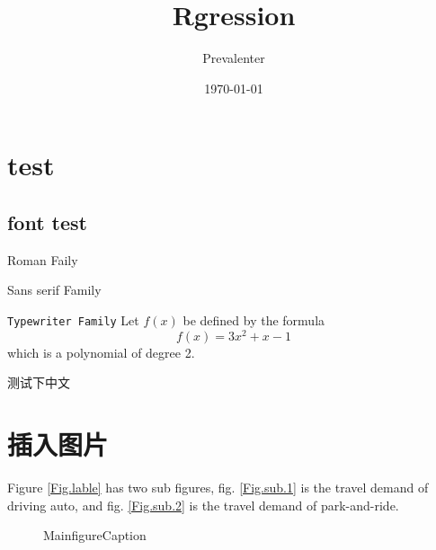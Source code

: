 \documentclass[10]{article}
\title{Rgression}
\author{Prevalenter}
\date{\today}
\begin{document}
	\maketitle
	\section{test}
	\subsection{font test}
	\textrm{Roman Faily}
	
	\textsf{Sans serif Family}
	
	\texttt{Typewriter Family}
	Let $f(x)$ be defined by the formula
	$$f(x)=3x^2+x-1$$
	which is a polynomial of degree 2.
	
	测试下中文
	
	\section{插入图片}
	Figure \ref{Fig.lable} has two sub figures, fig. \ref{Fig.sub.1} is the travel demand of driving auto, and fig. \ref{Fig.sub.2} is the travel demand of park-and-ride.
	
	\begin{figure}[H]
		\centering
		\caption{MainfigureCaption}
		\label{Fig.lable}
		\label{fig:visual_smap}
	\end{figure}
\end{document}
